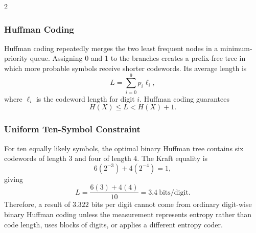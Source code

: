 \begin{multicols}{2}
  \subsubsection*{Huffman Coding}
  Huffman coding repeatedly merges the two least frequent nodes in a minimum-priority queue. Assigning 0 and 1 to the branches creates a prefix-free tree in which more probable symbols receive shorter codewords. Its average length is
  \[
    L=\sum_{i=0}^{9}p_i\ell_i,
  \]
  where $\ell_i$ is the codeword length for digit $i$. Huffman coding guarantees
  \[
    H(X)\leq L < H(X)+1.
  \]

  \subsubsection*{Uniform Ten-Symbol Constraint}
  For ten equally likely symbols, the optimal binary Huffman tree contains six codewords of length 3 and four of length 4. The Kraft equality is
  \[
    6\left(2^{-3}\right)+4\left(2^{-4}\right)=1,
  \]
  giving
  \[
    L=\frac{6(3)+4(4)}{10}=3.4\ \text{bits/digit}.
  \]
  Therefore, a result of $3.322$ bits per digit cannot come from ordinary digit-wise binary Huffman coding unless the measurement represents entropy rather than code length, uses blocks of digits, or applies a different entropy coder.

  \needspace{140pt}

\end{multicols}

